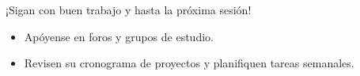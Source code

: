 \documentclass[10pt]{beamer}
\begin{document}
\begin{frame}
  \Huge{\centerline{¡Sigan con buen trabajo y hasta la próxima sesión!}}
  \vspace{0.5cm}
  \normalsize
  \begin{itemize}
    \item Apóyense en foros y grupos de estudio.
    \item Revisen su cronograma de proyectos y planifiquen tareas semanales.
  \end{itemize}
\end{frame}
\end{document}

